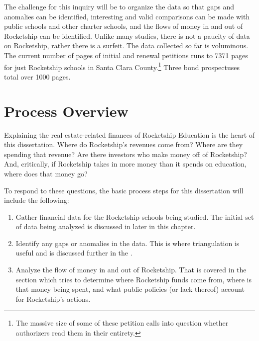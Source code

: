 The challenge for this inquiry will be to organize the data so that gaps and anomalies can be identified, interesting and valid comparisons can be made with public schools and other charter schools, and the flows of money in and out of Rocketship can be identified. Unlike many studies, there is not a paucity of data on Rocketship, rather there is a surfeit. The data collected so far is voluminous. The current number of pages of initial and renewal petitions runs to 7371 pages for just Rocketship schools in Santa Clara County.\footnote{The massive size of some of these petition calls into question whether authorizers read them in their entirety.} Three bond prospectuses total over 1000 pages. 

\section{Process Overview}\label{sec:process-overview}\indent

Explaining the real estate-related finances of Rocketship Education is the heart of this dissertation. Where do Rocketship's revenues come from? Where are they spending that revenue? Are there investors who make money off of Rocketship? And, critically, if Rocketship takes in more money than it spends on education, where does that money go?

To respond to these questions, the basic process steps for this dissertation will include the following:

\begin{enumerate}
  \item Gather financial data for the Rocketship schools being studied. The initial set of data being analyzed is discussed in  later in this chapter.
  \item Identify any gaps or anomalies in the data. This is where triangulation is useful and is discussed further in the . 
  \item Analyze the flow of money in and out of Rocketship. That  is covered in the section  which tries to determine where Rocketship funds come from, where is that money being spent, and what public policies (or lack thereof) account for Rocketship's actions.
\end{enumerate}

